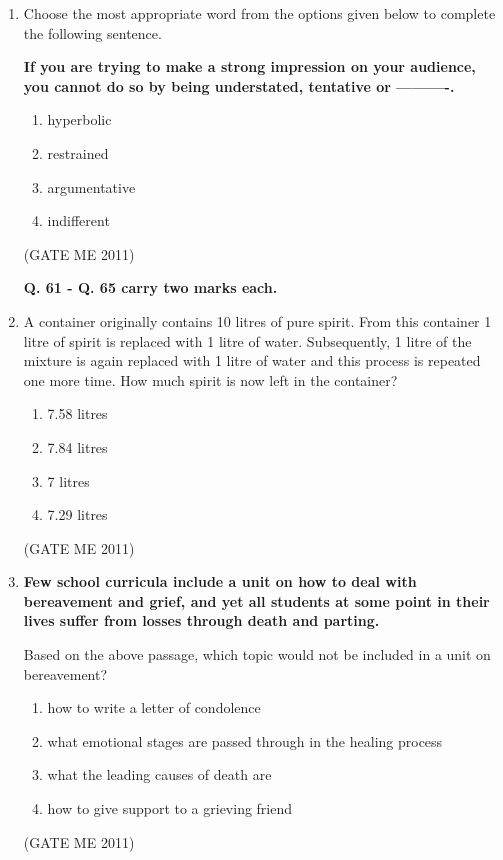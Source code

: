 \documentclass[journal]{IEEEtran}
\begin{document}
\begin{enumerate}
  \item Choose the most appropriate word from the options given below to complete the following sentence.
  
 \textbf{If you are trying to make a strong impression on your audience, you cannot do so by being understated, tentative or ----------.}

    \begin{enumerate}
      \item hyperbolic
      \item restrained
      \item argumentative
      \item indifferent
    \end{enumerate}
    \hfill (GATE ME 2011)

\textbf{Q. 61 - Q. 65 carry two marks each.}

\item A container originally contains 10 litres of pure spirit. From this container 1 litre of spirit is replaced with 1 litre of water. Subsequently, 1 litre of the mixture is again replaced with 1 litre of water and this process is repeated one more time. How much spirit is now left in the container?
\begin{multicols}{4}
  \begin{enumerate}
    \item 7.58 litres  
    \item 7.84 litres  
    \item 7 litres  
    \item 7.29 litres  
  \end{enumerate}
\end{multicols}     
\hfill (GATE ME 2011)

\item \textbf{Few school curricula include a unit on how to deal with bereavement and grief, and yet all students at some point in their lives suffer from losses through death and parting.}

Based on the above passage, which topic would not be included in a unit on bereavement?
  \begin{enumerate}
    \item how to write a letter of condolence  
    \item what emotional stages are passed through in the healing process  
    \item what the leading causes of death are  
    \item how to give support to a grieving friend  
  \end{enumerate}
  \hfill (GATE ME 2011)


\end{enumerate}
\end{document}
